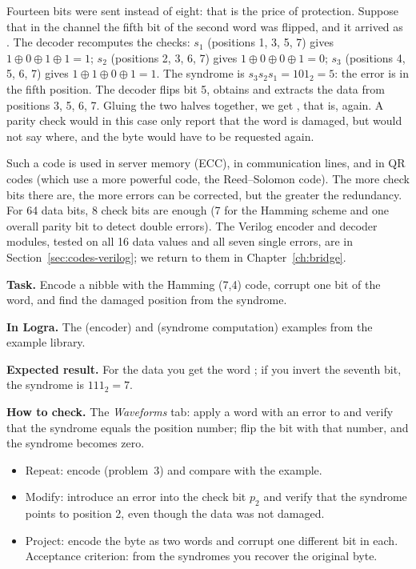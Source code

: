 Fourteen bits were sent instead of eight: that is the price of protection. Suppose that in the channel
the fifth bit of the second word was flipped, and it arrived as .
The decoder recomputes the checks: $s_1$ (positions 1, 3, 5, 7) gives
$1\oplus 0\oplus 1\oplus 1=1$; $s_2$ (positions 2, 3, 6, 7) gives
$1\oplus 0\oplus 0\oplus 1=0$; $s_3$ (positions 4, 5, 6, 7) gives
$1\oplus 1\oplus 0\oplus 1=1$. The syndrome is $s_3s_2s_1=101_2=5$: the error is in the fifth
position. The decoder flips bit 5, obtains  and extracts
the data  from positions 3, 5, 6, 7. Gluing the two halves together, we get
, that is,  again. A parity check would in this case
only report that the word is damaged, but would not say where, and the byte
would have to be requested again.

Such a code is used in server memory (ECC), in communication lines, and in QR codes (which
use a more powerful code, the Reed--Solomon code). The more check bits there are,
the more errors can be corrected, but the greater the redundancy. For 64 data bits,
8 check bits are enough (7 for the Hamming scheme and one overall parity bit
to detect double errors). The Verilog encoder and decoder modules, tested on
all 16 data values and all seven single errors, are in
Section~\ref{sec:codes-verilog}; we return to them in
Chapter~\ref{ch:bridge}.

\begin{diybox}
\textbf{Task.} Encode a nibble with the Hamming (7,4) code, corrupt one bit
of the word, and find the damaged position from the syndrome.\par
\textbf{In Logra.} The  (encoder) and
 (syndrome computation) examples from the example library.\par
\textbf{Expected result.} For the data  you get the word
; if you invert the seventh bit, the syndrome is $111_2=7$.\par
\textbf{How to check.} The \emph{Waveforms} tab: apply a word with an error to
 and verify that the syndrome equals the position number;
flip the bit with that number, and the syndrome becomes zero.
\begin{itemize}[leftmargin=3.4em,labelwidth=3em,labelsep=0.4em,align=left]
  \item[\stars{1}] Repeat: encode  (problem~3) and compare with
    the  example.
  \item[\stars{2}] Modify: introduce an error into the check bit $p_2$ and verify
    that the syndrome points to position 2, even though the data was not damaged.
  \item[\stars{3}] Project: encode the byte  as two words and corrupt
    one different bit in each. Acceptance criterion: from the syndromes you
    recover the original byte.
\end{itemize}
\end{diybox}

